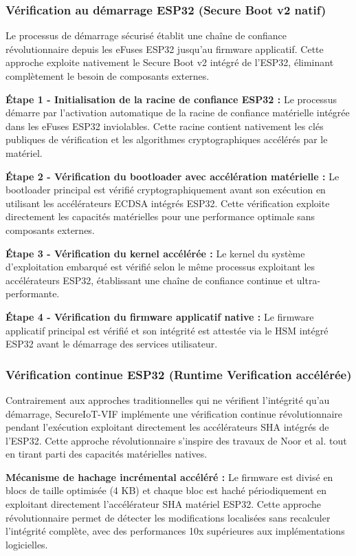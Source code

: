 \subsubsection{Vérification au démarrage ESP32 (Secure Boot v2 natif)}

Le processus de démarrage sécurisé établit une chaîne de confiance révolutionnaire depuis les eFuses ESP32 jusqu'au firmware applicatif. Cette approche exploite nativement le Secure Boot v2 intégré de l'ESP32, éliminant complètement le besoin de composants externes.

\textbf{Étape 1 - Initialisation de la racine de confiance ESP32 :} Le processus démarre par l'activation automatique de la racine de confiance matérielle intégrée dans les eFuses ESP32 inviolables. Cette racine contient nativement les clés publiques de vérification et les algorithmes cryptographiques accélérés par le matériel.

\textbf{Étape 2 - Vérification du bootloader avec accélération matérielle :} Le bootloader principal est vérifié cryptographiquement avant son exécution en utilisant les accélérateurs ECDSA intégrés ESP32. Cette vérification exploite directement les capacités matérielles pour une performance optimale sans composants externes.

\textbf{Étape 3 - Vérification du kernel accélérée :} Le kernel du système d'exploitation embarqué est vérifié selon le même processus exploitant les accélérateurs ESP32, établissant une chaîne de confiance continue et ultra-performante.

\textbf{Étape 4 - Vérification du firmware applicatif native :} Le firmware applicatif principal est vérifié et son intégrité est attestée via le HSM intégré ESP32 avant le démarrage des services utilisateur.

\subsubsection{Vérification continue ESP32 (Runtime Verification accélérée)}

Contrairement aux approches traditionnelles qui ne vérifient l'intégrité qu'au démarrage, SecureIoT-VIF implémente une vérification continue révolutionnaire pendant l'exécution exploitant directement les accélérateurs SHA intégrés de l'ESP32. Cette approche révolutionnaire s'inspire des travaux de Noor et al. \cite{Noor2025EILID} tout en tirant parti des capacités matérielles natives.

\textbf{Mécanisme de hachage incrémental accéléré :} Le firmware est divisé en blocs de taille optimisée (4 KB) et chaque bloc est haché périodiquement en exploitant directement l'accélérateur SHA matériel ESP32. Cette approche révolutionnaire permet de détecter les modifications localisées sans recalculer l'intégrité complète, avec des performances 10x supérieures aux implémentations logicielles.

